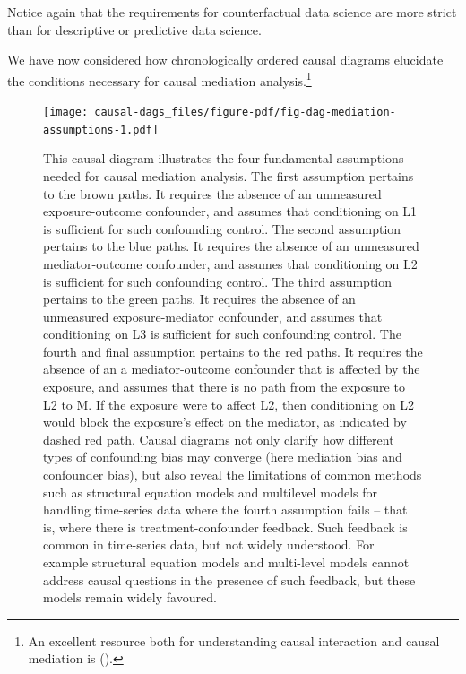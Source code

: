 \documentclass[
  singlecolumn,
  9pt]{article}
\begin{document}
Notice again that the requirements for counterfactual data science are
more strict than for descriptive or predictive data science.

We have now considered how chronologically ordered causal diagrams
elucidate the conditions necessary for causal mediation
analysis.\footnote{An excellent resource both for understanding causal
  interaction and causal mediation is
  ().}

\begin{figure}

{\centering \texttt{[image: causal-dags\_files/figure-pdf/fig-dag-mediation-assumptions-1.pdf]}

}

\caption{\label{fig-dag-mediation-assumptions}This causal diagram
illustrates the four fundamental assumptions needed for causal mediation
analysis. The first assumption pertains to the brown paths. It requires
the absence of an unmeasured exposure-outcome confounder, and assumes
that conditioning on L1 is sufficient for such confounding control. The
second assumption pertains to the blue paths. It requires the absence of
an unmeasured mediator-outcome confounder, and assumes that conditioning
on L2 is sufficient for such confounding control. The third assumption
pertains to the green paths. It requires the absence of an unmeasured
exposure-mediator confounder, and assumes that conditioning on L3 is
sufficient for such confounding control. The fourth and final assumption
pertains to the red paths. It requires the absence of an a
mediator-outcome confounder that is affected by the exposure, and
assumes that there is no path from the exposure to L2 to M. If the
exposure were to affect L2, then conditioning on L2 would block the
exposure's effect on the mediator, as indicated by dashed red path.
Causal diagrams not only clarify how different types of confounding bias
may converge (here mediation bias and confounder bias), but also reveal
the limitations of common methods such as structural equation models and
multilevel models for handling time-series data where the fourth
assumption fails -- that is, where there is treatment-confounder
feedback. Such feedback is common in time-series data, but not widely
understood. For example structural equation models and multi-level
models cannot address causal questions in the presence of such feedback,
but these models remain widely favoured.}

\end{figure}
\end{document}
